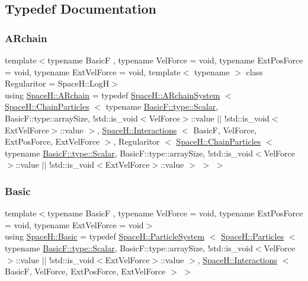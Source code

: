 \subsection{Typedef Documentation}
\mbox{\label{namespace_space_h_abc1e09cc3d2e2a92798269be7035b23d}} 
\subsubsection{\texorpdfstring{A\+Rchain}{ARchain}}
{\footnotesize\ttfamily template$<$typename BasicF , typename Vel\+Force  = void, typename Ext\+Pos\+Force  = void, typename Ext\+Vel\+Force  = void, template$<$ typename $>$ class Regularitor = Space\+H\+::\+LogH$>$ \\
using \mbox{\hyperlink{namespace_space_h_abc1e09cc3d2e2a92798269be7035b23d}{Space\+H\+::\+A\+Rchain}} = typedef \mbox{\hyperlink{class_space_h_1_1_a_rchain_system}{Space\+H\+::\+A\+Rchain\+System}} $<$ \mbox{\hyperlink{class_space_h_1_1_chain_particles}{Space\+H\+::\+Chain\+Particles}} $<$ typename \mbox{\hyperlink{test_orbit_8cpp_a8c2981f3f834be9448a6ab06c28748eb}{Basic\+F\+::type\+::\+Scalar}}, Basic\+F\+::type\+::array\+Size, !std\+::is\+\_\+void$<$Vel\+Force$>$\+::value $\vert$$\vert$ !std\+::is\+\_\+void$<$Ext\+Vel\+Force$>$\+::value $>$, \mbox{\hyperlink{class_space_h_1_1_interactions}{Space\+H\+::\+Interactions}} $<$ BasicF, Vel\+Force, Ext\+Pos\+Force, Ext\+Vel\+Force $>$, Regularitor $<$ \mbox{\hyperlink{class_space_h_1_1_chain_particles}{Space\+H\+::\+Chain\+Particles}} $<$ typename \mbox{\hyperlink{test_orbit_8cpp_a8c2981f3f834be9448a6ab06c28748eb}{Basic\+F\+::type\+::\+Scalar}}, Basic\+F\+::type\+::array\+Size, !std\+::is\+\_\+void$<$Vel\+Force$>$\+::value $\vert$$\vert$ !std\+::is\+\_\+void$<$Ext\+Vel\+Force$>$\+::value $>$ $>$ $>$}

\mbox{\label{namespace_space_h_a927de8f6d7d1be27a19583aa477b8d98}} 
\subsubsection{\texorpdfstring{Basic}{Basic}}
{\footnotesize\ttfamily template$<$typename BasicF , typename Vel\+Force  = void, typename Ext\+Pos\+Force  = void, typename Ext\+Vel\+Force  = void$>$ \\
using \mbox{\hyperlink{namespace_space_h_a927de8f6d7d1be27a19583aa477b8d98}{Space\+H\+::\+Basic}} = typedef \mbox{\hyperlink{class_space_h_1_1_particle_system}{Space\+H\+::\+Particle\+System}} $<$ \mbox{\hyperlink{struct_space_h_1_1_particles}{Space\+H\+::\+Particles}} $<$ typename \mbox{\hyperlink{test_orbit_8cpp_a8c2981f3f834be9448a6ab06c28748eb}{Basic\+F\+::type\+::\+Scalar}}, Basic\+F\+::type\+::array\+Size, !std\+::is\+\_\+void$<$Vel\+Force$>$\+::value $\vert$$\vert$ !std\+::is\+\_\+void$<$Ext\+Vel\+Force$>$\+::value $>$, \mbox{\hyperlink{class_space_h_1_1_interactions}{Space\+H\+::\+Interactions}} $<$ BasicF, Vel\+Force, Ext\+Pos\+Force, Ext\+Vel\+Force $>$ $>$}


